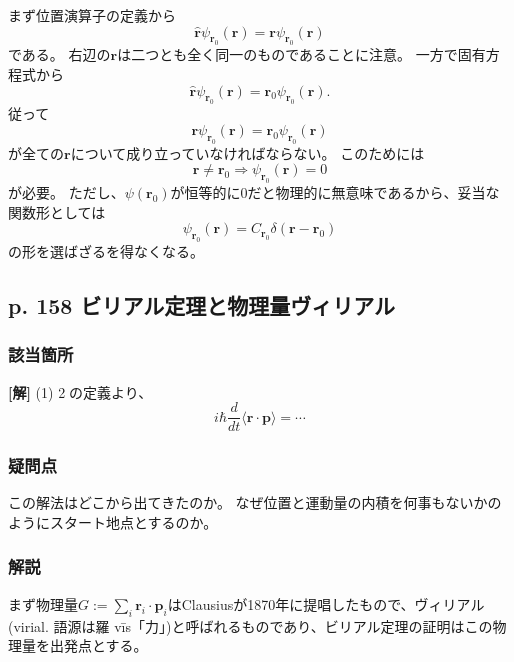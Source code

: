 \documentclass{jsarticle}
\begin{document}
まず位置演算子の定義から
\begin{equation*}
    \hat{\bm{r}}\psi_{\bm{r}_0}(\bm{r})=\bm{r}\psi_{\bm{r}_0}(\bm{r})
\end{equation*}
である。
右辺の$\bm{r}$は二つとも全く同一のものであることに注意。
一方で固有方程式から
\begin{equation*}
    \hat{\bm{r}}\psi_{\bm{r}_0}(\bm{r})=\bm{r}_0\psi_{\bm{r}_0}(\bm{r}).
\end{equation*}
従って
\begin{equation*}
    \bm{r}\psi_{\bm{r}_0}(\bm{r})=\bm{r}_0\psi_{\bm{r}_0}(\bm{r})
\end{equation*}
が全ての$\bm{r}$について成り立っていなければならない。
このためには
\begin{equation*}
    \bm{r}\neq\bm{r}_0\Longrightarrow\psi_{\bm{r}_0}(\bm{r})=0
\end{equation*}
が必要。
ただし、$\psi(\bm{r}_0)$が恒等的に$0$だと物理的に無意味であるから、妥当な関数形としては
\begin{equation*}
    \psi_{\bm{r}_0}(\bm{r})=C_{\bm{r}_0}\delta(\bm{r}-\bm{r}_0)
\end{equation*}
の形を選ばざるを得なくなる。


\subsection*{p. 158 ビリアル定理と物理量ヴィリアル}

\subsubsection*{該当箇所}

\textbf{[解]}  (1) \textcircled{2}の定義より、
\begin{equation*}
    i\hbar\dfrac{d}{dt}\langle\bm{r}\cdot\bm{p}\rangle
    =\cdots
\end{equation*}

\subsubsection*{疑問点}

この解法はどこから出てきたのか。
なぜ位置と運動量の内積を何事もないかのようにスタート地点とするのか。

\subsubsection*{解説}
まず物理量$G:=\displaystyle\sum_i\bm{r}_i\cdot \bm{p}_i$はClausiusが1870年に提唱したもので、ヴィリアル (virial. 語源は羅 vīs「力」)と呼ばれるものであり、ビリアル定理の証明はこの物理量を出発点とする。
\end{document}
